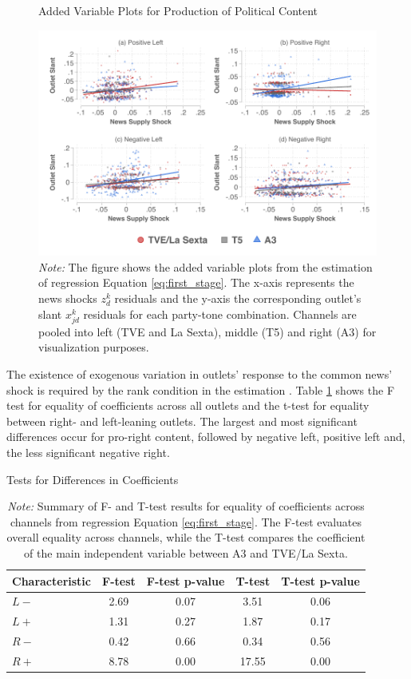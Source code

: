 \documentclass[12pt]{article}
\begin{document}
		\begin{figure}[!htb]
		\centering
\caption{Added Variable Plots for Production of Political Content}
		\includegraphics[width=160mm]{figures/fwl_plots_v2}
		\caption*{\small \textit{Note:} The figure shows the added variable plots from the estimation of regression Equation \eqref{eq:first_stage}. The x-axis represents the news shocks $z_d^k $ residuals and the y-axis the corresponding outlet's slant $x_{jd}^k $ residuals for each party-tone combination. Channels are pooled into left (TVE and La Sexta), middle (T5) and right (A3) for visualization purposes.  }
		\label{fig:fwl}
	\end{figure}
	
		The existence of exogenous variation in outlets' response to the common news' shock is required by the rank condition in the estimation \citep{berry_haile_econometrica}.  Table \ref{tab:tests}   shows the F test for equality of coefficients across all outlets and the t-test for equality between right- and left-leaning outlets. The largest and most significant differences occur for pro-right content, followed by negative left, positive left and, the less significant negative right. 
	
	
	
	\begin{table}[!htbp]
		\centering
	

		\caption{Tests for Differences in Coefficients}
		\begin{tabular}{lcccc}
			\hline
			Characteristic & F-test  & F-test p-value & T-test  & T-test p-value \\
			\hline
			$ {L-}$& 2.69 & 0.07 & 3.51  & 0.06 \\
			$ {L+}$ & 1.31 & 0.27 & 1.87  & 0.17 \\
			$ {R-}$ & 0.42 & 0.66 & 0.34 & 0.56 \\
$ {R+}$ & 8.78 & 0.00 & 17.55  & 0.00 \\
			\hline
		\end{tabular}
			\caption*{\small \textit{Note:} Summary of F- and T-test results for equality of coefficients across channels from regression Equation \eqref{eq:first_stage}. The F-test evaluates overall equality across channels, while the T-test compares the coefficient of the main independent variable between A3 and TVE/La Sexta.}
					\label{tab:tests}
	\end{table}
	
\end{document}
